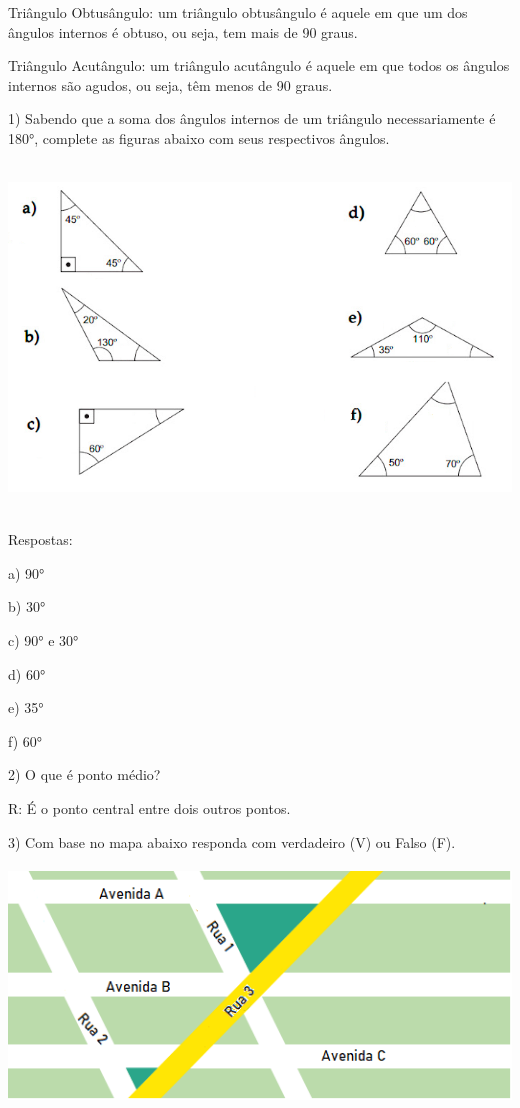 Triângulo Obtusângulo: um triângulo obtusângulo é aquele em que um dos
ângulos internos é obtuso, ou seja, tem mais de 90 graus.

Triângulo Acutângulo: um triângulo acutângulo é aquele em que todos os
ângulos internos são agudos, ou seja, têm menos de 90 graus.


1) Sabendo que a soma dos ângulos internos de um triângulo
necessariamente é 180°, complete as figuras abaixo com seus respectivos
ângulos.

\includegraphics[width=5.90625in,height=3.63542in]{./imgSAEB_6_MAT/media/image52.png}

Respostas:

a) 90°

b) 30°

c) 90° e 30°

d) 60°

e) 35°

f) 60°

2) O que é ponto médio?

R: É o ponto central entre dois outros pontos.

3) Com base no mapa abaixo responda com verdadeiro (V) ou Falso (F).

\includegraphics[width=5.47917in,height=2.48958in]{./imgSAEB_6_MAT/media/image53.png}

